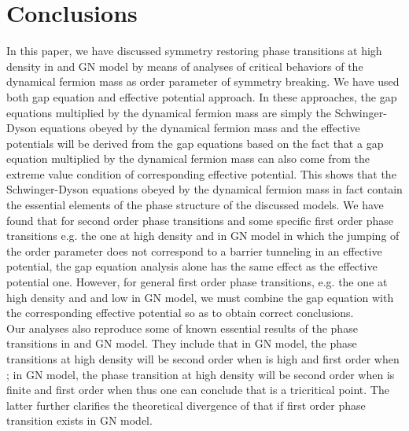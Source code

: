 \documentclass[a4paper,eqsecnum]{revtex4}
\begin{document}
\section{Conclusions \label{sec: conclusions}}
In this paper, we have discussed symmetry restoring phase transitions at high density 
in \coordHE{} and \coordHE{} GN model by means of analyses of critical behaviors of the dynamical 
fermion mass as order parameter of symmetry breaking. We have used both gap 
equation and effective potential approach. In these approaches, the gap equations 
multiplied by the dynamical fermion mass are simply the Schwinger-Dyson equations 
obeyed by the dynamical fermion mass and the effective potentials will be derived 
from the gap equations based on the fact that a gap equation multiplied by the 
dynamical fermion mass can also come from the extreme value condition of corresponding 
effective potential. This shows that the Schwinger-Dyson equations obeyed by the 
 dynamical fermion mass in fact contain the essential elements of the phase structure 
of the discussed models. We have found that for second order phase transitions and 
some specific first order phase transitions e.g. the one at high density and \coordHE{} 
in \coordHE{} GN model in which the jumping of the order parameter does not correspond 
to a barrier tunneling in an effective potential, the gap equation analysis alone 
has the same effect as the effective potential one. However, for general first order 
phase transitions, e.g. the one  at high density and \coordHE{} and low \coordHE{} in \coordHE{} 
GN model, we must combine the gap equation with the corresponding effective potential 
so as to obtain correct conclusions. \\
\indent Our analyses also reproduce some of known essential results of the phase 
transitions in \coordHE{} and \coordHE{} GN model. They include that in \coordHE{} GN model, the 
phase transitions at high density will be second order when \coordHE{} is high and first 
order when \coordHE{}; in \coordHE{} GN model, the phase transition at high density will be second order when \coordHE{} is finite and first order when \coordHE{} thus one can conclude that \coordHE{} is a tricritical point. The latter further clarifies the theoretical divergence of that if first order phase transition exists in \coordHE{} GN model. 
\end{document}
